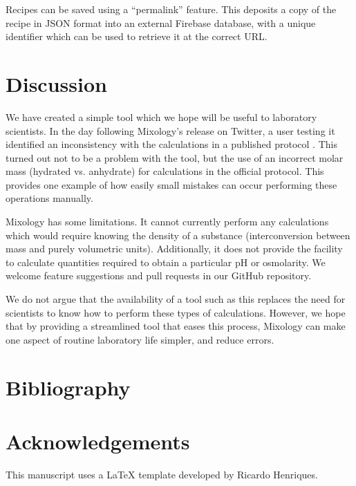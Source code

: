 \documentclass[times, twoside]{zHenriquesLab-StyleBioRxiv}
\begin{document}
Recipes can be saved using a ``permalink'' feature. This deposits a copy of the recipe in JSON format into an external Firebase database, with a unique identifier which can be used to retrieve it at the correct URL. 


\section*{Discussion}

We have created a simple tool which we hope will be useful to laboratory scientists. In the day following Mixology's release on Twitter, a user testing it identified an inconsistency with the calculations in a published protocol \cite{pub_protocol}. This turned out not to be a problem with the tool, but the use of an incorrect molar mass (hydrated vs. anhydrate) for calculations in the official protocol. This provides one example of how easily small mistakes can occur performing these operations manually.

Mixology has some limitations. It cannot currently perform any calculations which would require knowing the density of a substance (interconversion between mass and purely volumetric units). Additionally, it does not provide the facility to calculate quantities required to obtain a particular pH or osmolarity. We welcome feature suggestions and pull requests in our GitHub repository.

We do not argue that the availability of a tool such as this replaces the need for scientists to know how to perform these types of calculations. However, we hope that by providing a streamlined tool that eases this process, Mixology can make one aspect of routine laboratory life simpler, and reduce errors.





\section*{Bibliography}



\section*{Acknowledgements}
This manuscript uses a LaTeX template developed by Ricardo Henriques.
\end{document}
